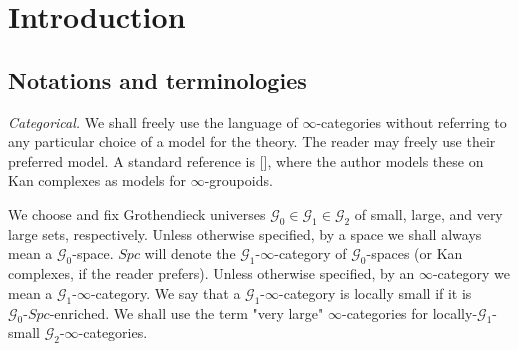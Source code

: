 \begin{abstract}
We develop a general $\infty$-categorical framework for internal Eilenberg-MacLane objects, internal homotopy groups, and an internal notion of covering spaces, and study their behavior under suitable localizations. Applying this to the ordinary motivic localization, we identify internal $n$-Eilenberg-MacLane objects with strongly $\mathbb{A}^1$-invariant sheaves of (abelian when $n\geq 2$) groups, yielding a formal obstruction to the motivic homotopy category being an $\infty$-topos. We prove that taking $\mathbb{A}^1$-localizations induces an equivalence between classical $\mathbb{A}^1$-coverings of a Nisnevich local space and the internal motivic coverings of its motivic localization, providing a streamlined proof of a generalized motivic Van Kampen theorem. Along the way, we establish a Nisnevich-local-to-global $\mathbb{A}^1$-connectivity criterion: a $k$-scheme is $\mathbb{A}^1$-connected if and only if it admits a Nisnevich cover by $\mathbb{A}^1$-connected schemes such that each pairwise intersection has a ($k$-)point. Finally, we show that over a general Qcqs base, passing to the birational motivic homotopy category recovers certain essential topos-theoretic properties absent in the ordinary $\mathbb{A}^1$-setting. In fact, for a scheme with finitely many generic points, we show that the birational motivic homotopy category is a Postnikov-complete $\infty$-topos of cohomological dimension $0$.
\end{abstract}

\tableofcontents

\section{Introduction}

\subsection{Notations and terminologies}
\textit{Categorical.} 
We shall freely use the language of $\infty$-categories without referring to any particular choice of a model for the theory. The reader may freely use their preferred model. A standard reference is [\cite{lurie2009higher}], where the author models these on Kan complexes as models for $\infty$-groupoids.

We choose and fix Grothendieck universes $\mathcal{G}_0\in \mathcal{G}_1\in \mathcal{G}_2$ of small, large, and very large sets, respectively. Unless otherwise specified, by a space we shall always mean a $\mathcal{G}_0$-space. $Spc$ will denote the $\mathcal{G}_1$-$\infty$-category of $\mathcal{G}_0$-spaces (or Kan complexes, if the reader prefers). Unless otherwise specified, by an $\infty$-category we mean a $\mathcal{G}_1$-$\infty$-category. We say that a $\mathcal{G}_1$-$\infty$-category is locally small if it is $\mathcal{G}_0\mbox{-}Spc$-enriched. We shall use the term "very large" $\infty$-categories for locally-$\mathcal{G}_1$-small $\mathcal{G}_2$-$\infty$-categories. 

